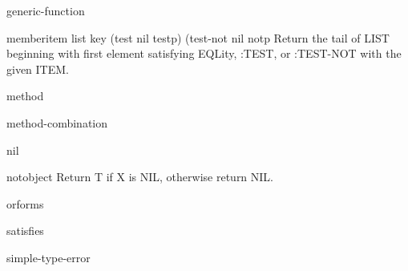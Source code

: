 \begin{class}{generic-function}{}{}
  
\end{class}

\begin{type-specifier}{member}{item list \key key (test nil testp) (test-not nil notp}{}
  Return the tail of LIST beginning with first element satisfying EQLity,
   :TEST, or :TEST-NOT with the given ITEM.
\end{type-specifier}

\begin{class}{method}{}{}
  
\end{class}

\begin{class}{method-combination}{}{}
  
\end{class}

\begin{type}{nil}{}{}
  
\end{type}

\begin{type-specifier}{not}{object}{}
  Return T if X is NIL, otherwise return NIL.
\end{type-specifier}

\begin{type-specifier}{or}{\rest forms}{}
  
\end{type-specifier}

\begin{type-specifier}{satisfies}{}{}
  
\end{type-specifier}

\begin{condition-type}{simple-type-error}{}{}
  
\end{condition-type}
